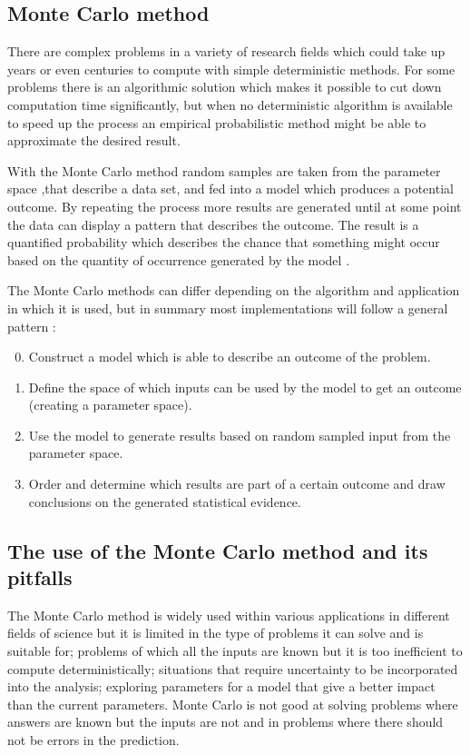 \subsection{Monte Carlo method}
There are complex problems in a variety of research fields which could take up years or even centuries to compute with simple deterministic methods. For some problems there is an algorithmic solution which makes it possible to cut down computation time significantly, but when no deterministic algorithm is available to speed up the process an empirical probabilistic method might be able to approximate the desired result. 

With the Monte Carlo method random samples are taken from the parameter space ,that describe a data set, and fed into a model which produces a potential outcome. By repeating the process more results are generated until at some point the data can display a pattern that describes the outcome. The result is a quantified probability which describes the chance that something might occur based on the quantity of occurrence generated by the model \cite{stephanie_monte_2015,wikipedia_monte_2019,wikipedia_monte-carlosimulatie_2018}.

\newline
The Monte Carlo methods can differ depending on the algorithm and application in which it is used, but in summary most implementations will follow a general pattern \cite{wikipedia_monte_2019}:
\begin{enumerate}
	\setcounter{enumi}{-1}
	\item Construct a model which is able to describe an outcome of the problem.
	\item Define the space of which inputs can be used by the model to get an outcome (creating a parameter space). 
	\item Use the model to generate results based on random sampled input from the parameter space.
	\item Order and determine which results are part of a certain outcome and draw conclusions on the generated statistical evidence.
\end{enumerate}

\label{subsec:Monte_Carlo_Method}

\subsection{The use of the Monte Carlo method and its pitfalls}
The Monte Carlo method is widely used within various applications in different fields of science but it is limited in the type of problems it can solve and is suitable for; problems of which all the inputs are known but it is too inefficient to compute deterministically; situations that require uncertainty to be incorporated into the analysis; exploring parameters for a model that give a better impact than the current parameters. Monte Carlo is not good at solving problems where answers are known but the inputs are not and in problems where there should not be errors in the prediction.


